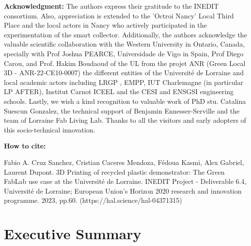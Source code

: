 \documentclass[
  11pt,
]{article}
\renewcommand*\contentsname{Table of contents}
\newcommand\contentsname{Table of contents}
\begin{document}
\textbf{Acknowledgment:}\newline
The authors express their gratitude to the INEDIT consortium. 
Also, appreciation is extended to the 'Octroi Nancy' Local Third Place and 
the local actors in Nancy who actively participated in the experimentation of the smart collector. 
Additionally, the authors acknowledge the valuable scientific collaboration with the Western University in Ontario, Canada, specially with Prof Joshua PEARCE, 
Universidade de Vigo in Spain, Prof Diego Carou, and Prof. Hakim Boudaoud of the UL from the projet ANR (Green Local 3D - ANR-22-CE10-0007)
the different entities of the Université de Lorraine and local academic actors including LRGP , EMPP, IUT Charlemagne (in particular LP AFTER),
Institut Carnot ICEEL  and the  CESI and ENSGSI engineering schools.
Lastly, we wish a kind recognition to valuable work of PhD stu. Catalina Suescun Gonzalez, the technical support of Benjamin Ennesser-Serville and the team of Lorraine Fab Living Lab.   
Thanks to all the visitors and early adopters of this socio-technical innovation.

\vspace{2cm}

\textbf{How to cite:} \newline

Fabio A. Cruz Sanchez, Cristian Caceres Mendoza, Fédoua Kasmi, Alex Gabriel, Laurent Dupont. 3D Printing of recycled plastic demonstrator: The Green FabLab use case at the Université de Lorraine. INEDIT Project - Deliverable 6.4, Université de Lorraine; European Union’s Horizon 2020 research and innovation programme. 2023, pp.60. (https://hal.science/hal-04371315)


\vfill
\newpage

\ifdefined\Shaded\renewenvironment{Shaded}{\begin{tcolorbox}[frame hidden, borderline west={3pt}{0pt}{shadecolor}, enhanced, sharp corners, boxrule=0pt, interior hidden, breakable]}{\end{tcolorbox}}\fi

\renewcommand*\contentsname{Table of contents}
{
\hypersetup{linkcolor=}
\setcounter{tocdepth}{3}
\tableofcontents
}
\newpage

\bgroup
\hypersetup{linkcolor = black}
\listoffigures
\egroup

\color{darkgray}

\newpage

\hypertarget{executive-summary}{%
\section{Executive Summary}\label{executive-summary}}
\end{document}
